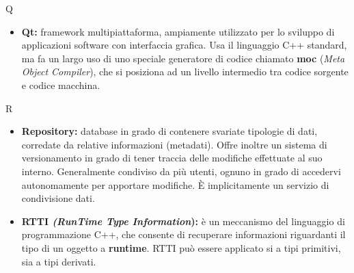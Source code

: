 \Huge Q
\normalsize
\begin{itemize}
\item\textbf{Qt:} framework multipiattaforma, ampiamente utilizzato per lo sviluppo di applicazioni software con interfaccia grafica. Usa il linguaggio C++\glossario{} standard, ma fa un largo uso di uno speciale generatore di codice chiamato \textbf{moc} (\textit{Meta Object Compiler}), che si posiziona ad un livello intermedio tra codice sorgente e codice macchina.
\end{itemize}
\pagebreak

\Huge R
\normalsize
\begin{itemize}
\item\textbf{Repository:} database in grado di contenere svariate tipologie di dati, corredate da relative informazioni (metadati). Offre inoltre un sistema di versionamento in grado di tener traccia delle modifiche effettuate al suo interno. Generalmente condiviso da più utenti, ognuno in grado di accedervi autonomamente per apportare modifiche. \`E implicitamente un servizio di condivisione dati.

\item\textbf{RTTI \textit{(RunTime Type Information}):} è un meccanismo del linguaggio di programmazione C++\glossario{}, che consente di recuperare informazioni riguardanti il tipo di un oggetto a \textbf{runtime}. RTTI può essere applicato si a tipi primitivi, sia a tipi derivati.
\end{itemize}
\pagebreak

